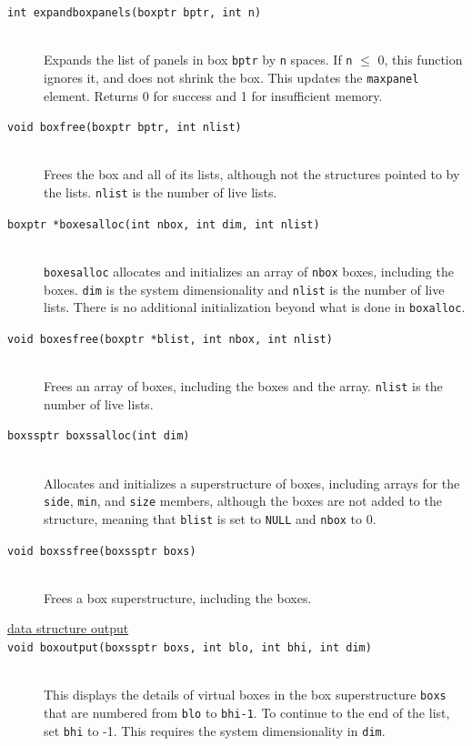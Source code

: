 \documentclass {scrbook}
\newcommand {\ttt} {\texttt}
\begin{document}
\begin{description}
\item[\ttt{int expandboxpanels(boxptr bptr, int n)}]
\hfill \\
Expands the list of panels in box \ttt{bptr} by \ttt{n} spaces. If \ttt{n} $\leq$ 0, this function ignores it, and does not shrink the box. This updates the \ttt{maxpanel} element. Returns 0 for success and 1 for insufficient memory.

\item[\ttt{void boxfree(boxptr bptr, int nlist)}]
\hfill \\
Frees the box and all of its lists, although not the structures pointed to by the lists. \ttt{nlist} is the number of live lists.

\item[\ttt{boxptr *boxesalloc(int nbox, int dim, int nlist)}]
\hfill \\
\ttt{boxesalloc} allocates and initializes an array of \ttt{nbox} boxes, including the boxes. \ttt{dim} is the system dimensionality and \ttt{nlist} is the number of live lists. There is no additional initialization beyond what is done in \ttt{boxalloc}.

\item[\ttt{void boxesfree(boxptr *blist, int nbox, int nlist)}]
\hfill \\
Frees an array of boxes, including the boxes and the array. \ttt{nlist} is the number of live lists.

\item[\ttt{boxssptr boxssalloc(int dim)}]
\hfill \\
Allocates and initializes a superstructure of boxes, including arrays for the \ttt{side}, \ttt{min}, and \ttt{size} members, although the boxes are not added to the structure, meaning that \ttt{blist} is set to \ttt{NULL} and \ttt{nbox} to 0.

\item[\ttt{void boxssfree(boxssptr boxs)}]
\hfill \\
Frees a box superstructure, including the boxes.

\item[\underline{data structure output}]

\item[\ttt{void boxoutput(boxssptr boxs, int blo, int bhi, int dim)}]
\hfill \\
This displays the details of virtual boxes in the box superstructure \ttt{boxs} that are numbered from \ttt{blo} to \ttt{bhi-1}. To continue to the end of the list, set \ttt{bhi} to -1. This requires the system dimensionality in \ttt{dim}.


\end{description}
\end{document}
